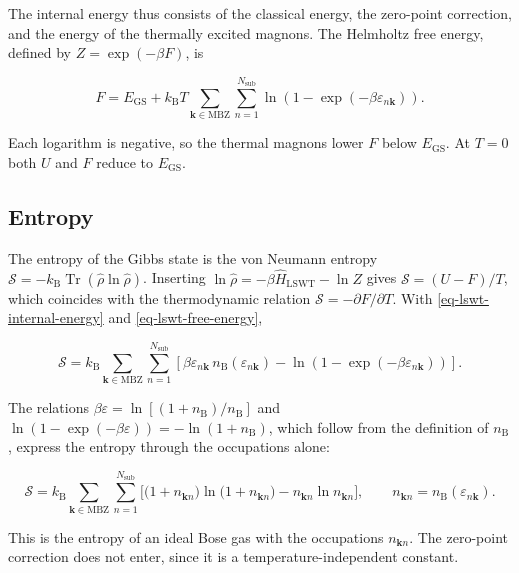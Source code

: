 The internal energy thus consists of the classical energy, the zero-point correction, and the energy of the thermally excited magnons. The Helmholtz free energy, defined by \(Z=\exp(-\beta F)\), is

\begin{equation}\label{eq-lswt-free-energy}
F=E_{\mathrm{GS}}+k_{\mathrm B}T\sum_{\mathbf k\in\mathrm{MBZ}}\sum_{n=1}^{N_{\mathrm{sub}}}\ln\!\left(1-\exp(-\beta\varepsilon_{n\mathbf k})\right).
\end{equation}

Each logarithm is negative, so the thermal magnons lower \(F\) below \(E_{\mathrm{GS}}\). At \(T=0\) both \(U\) and \(F\) reduce to \(E_{\mathrm{GS}}\).

\subsection{Entropy}

The entropy of the Gibbs state is the von Neumann entropy \(\mathcal S=-k_{\mathrm B}\operatorname{Tr}(\hat\rho\ln\hat\rho)\). Inserting \(\ln\hat\rho=-\beta\hat H_{\mathrm{LSWT}}-\ln Z\) gives \(\mathcal S=(U-F)/T\), which coincides with the thermodynamic relation \(\mathcal S=-\partial F/\partial T\). With \eqref{eq-lswt-internal-energy} and \eqref{eq-lswt-free-energy},

\[
\mathcal S=k_{\mathrm B}\sum_{\mathbf k\in\mathrm{MBZ}}\sum_{n=1}^{N_{\mathrm{sub}}}
\left[\beta\varepsilon_{n\mathbf k}\,n_{\mathrm B}(\varepsilon_{n\mathbf k})-\ln\!\left(1-\exp(-\beta\varepsilon_{n\mathbf k})\right)\right].
\]

The relations \(\beta\varepsilon=\ln[(1+n_{\mathrm B})/n_{\mathrm B}]\) and \(\ln(1-\exp(-\beta\varepsilon))=-\ln(1+n_{\mathrm B})\), which follow from the definition of \(n_{\mathrm B}\), express the entropy through the occupations alone:

\begin{equation}\label{eq-lswt-magnon-entropy}
\mathcal S=k_{\mathrm B}\sum_{\mathbf k\in\mathrm{MBZ}}\sum_{n=1}^{N_{\mathrm{sub}}}
\Big[\big(1+n_{\mathbf kn}\big)\ln\big(1+n_{\mathbf kn}\big)-n_{\mathbf kn}\ln n_{\mathbf kn}\Big],
\qquad
n_{\mathbf kn}=n_{\mathrm B}(\varepsilon_{n\mathbf k}).
\end{equation}

This is the entropy of an ideal Bose gas with the occupations \(n_{\mathbf kn}\). The zero-point correction does not enter, since it is a temperature-independent constant.


